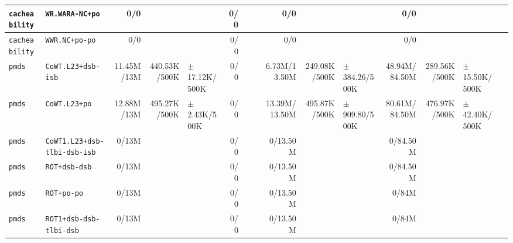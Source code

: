 \begin{tabular}{l l  | r r l | r r l | r r l | r r l l}
   \verb|cacheability| &                                        \verb|WR.WARA-NC+po| &            0/0 &                       &                   &            0/0 &                       &  &            0/0 &                       &                   &            0/0 &                       &                    & \\ \hline 
   \verb|cacheability| &                                         \verb|WWR.NC+po-po| &            0/0 &                       &                   &            0/0 &                       &  &            0/0 &                       &                   &            0/0 &                       &                    & \\ \hline 
           \verb|pmds| &                                     \verb|CoWT.L23+dsb-isb| &     11.45M/13M &          440.53K/500K & $\pm$ 17.12K/500K &            0/0 &                       &  &   6.73M/13.50M &          249.08K/500K & $\pm$ 384.26/500K &  48.94M/84.50M &          289.56K/500K &  $\pm$ 15.50K/500K & \\ \hline 
           \verb|pmds| &                                          \verb|CoWT.L23+po| &     12.88M/13M &          495.27K/500K &  $\pm$ 2.43K/500K &            0/0 &                       &  &  13.39M/13.50M &          495.87K/500K & $\pm$ 909.80/500K &  80.61M/84.50M &          476.97K/500K &  $\pm$ 42.40K/500K & \\ \hline 
           \verb|pmds| &                           \verb|CoWT1.L23+dsb-tlbi-dsb-isb| &          0/13M &                       &                   &            0/0 &                       &  &       0/13.50M &                       &                   &       0/84.50M &                       &                    & \\ \hline 
           \verb|pmds| &                                          \verb|ROT+dsb-dsb| &          0/13M &                       &                   &            0/0 &                       &  &       0/13.50M &                       &                   &       0/84.50M &                       &                    & \\ \hline 
           \verb|pmds| &                                            \verb|ROT+po-po| &          0/13M &                       &                   &            0/0 &                       &  &       0/13.50M &                       &                   &          0/84M &                       &                    & \\ \hline 
           \verb|pmds| &                                \verb|ROT1+dsb-dsb-tlbi-dsb| &          0/13M &                       &                   &            0/0 &                       &  &       0/13.50M &                       &                   &          0/84M &                       &                    & \\ \hline 

\end{tabular}
